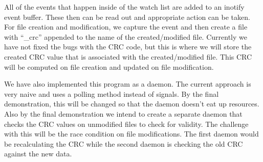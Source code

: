 All of the events that happen inside of the watch list are added to an inotify event buffer. 
These then can be read out and appropriate action can be taken. For file creation and 
modification, we capture the event and then create a file with ``\_crc'' appended to 
the name of the created/modified file. Currently we have not fixed the bugs with 
the CRC code, but this is where we will store the created CRC value that is 
associated with the created/modified file. This CRC will be computed on file creation
and updated on file modification.

We have also implemented this program as a daemon. The current approach is very
naive and uses a polling method instead of signals. By the final demonstration, this
will be changed so that the daemon doesn't eat up resources. Also by the final
demonstration we intend to create a separate daemon that checks the CRC 
values on unmodified files to check for validity. The challenge with this will be
the race condition on file modifications. The first daemon would be recalculating
the CRC while the second daemon is checking the old CRC against the new data.






